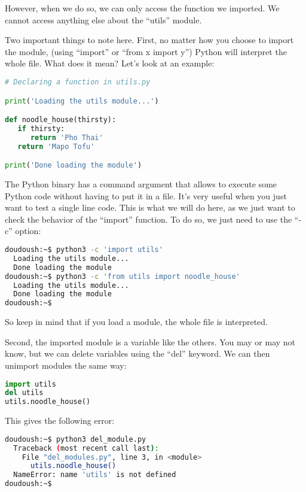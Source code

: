 However, when we do so, we can only access the function we imported. We cannot access anything
else about the ``utils'' module.

Two important things to note here. First, no matter how you choose to import the module,
(using ``import'' or ``from x import y'') Python will interpret the whole file. What does
it mean? Let's look at an example:

\begin{lstlisting}[language=python]
# Declaring a function in utils.py

print('Loading the utils module...')

def noodle_house(thirsty):
   if thirsty:
      return 'Pho Thai'
   return 'Mapo Tofu'

print('Done loading the module')
\end{lstlisting}

The Python binary has a command argument that allows to execute some Python code without
having to put it in a file. It's very useful when you just want to test a single line code.
This is what we will do here, as we just want to check the behavior of the ``import'' function.
To do so, we just need to use the ``-c'' option:

\begin{lstlisting}[language=bash]
doudoush:~$ python3 -c 'import utils'
  Loading the utils module...
  Done loading the module
doudoush:~$ python3 -c 'from utils import noodle_house'
  Loading the utils module...
  Done loading the module
doudoush:~$
\end{lstlisting}

So keep in mind that if you load a module, the whole file is interpreted.

\vspace{5mm}

Second, the imported module is a variable like the others.
You may or may not know, but we can delete variables using the ``del'' keyword. We can then
unimport modules the same way:

\begin{lstlisting}[language=python]
import utils
del utils
utils.noodle_house()
\end{lstlisting}

This gives the following error:
\begin{lstlisting}[language=bash]
doudoush:~$ python3 del_module.py
  Traceback (most recent call last):
    File "del_modules.py", line 3, in <module>
      utils.noodle_house()
  NameError: name 'utils' is not defined
doudoush:~$
\end{lstlisting}

